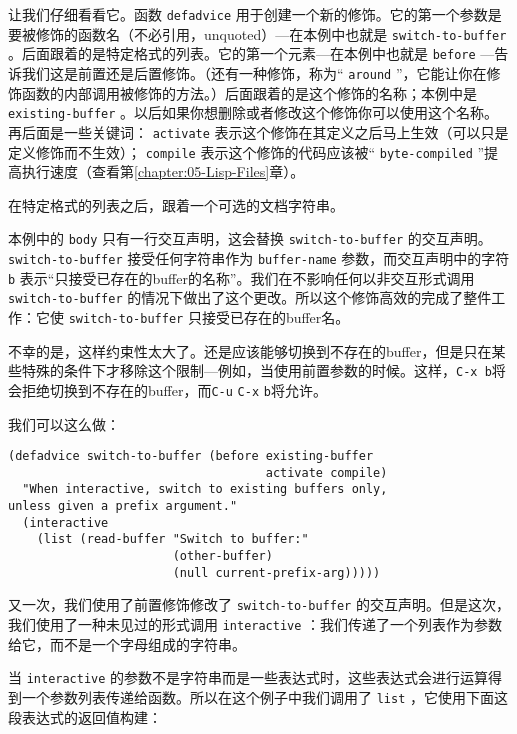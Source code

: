 让我们仔细看看它。函数 \texttt{defadvice} 用于创建一个新的修饰。它的第一个参数是要被修饰的函数名（不必引用，unquoted）---在本例中也就是 \texttt{switch-to-buffer} 。后面跟着的是特定格式的列表。它的第一个元素---在本例中也就是 \texttt{before} ---告诉我们这是前置还是后置修饰。（还有一种修饰，称为“ \texttt{around} ”，它能让你在修饰函数的内部调用被修饰的方法。）后面跟着的是这个修饰的名称；本例中是 \texttt{existing-buffer} 。以后如果你想删除或者修改这个修饰你可以使用这个名称。再后面是一些关键词： \texttt{activate} 表示这个修饰在其定义之后马上生效（可以只是定义修饰而不生效）； \texttt{compile} 表示这个修饰的代码应该被“ \texttt{byte-compiled} ”提高执行速度（查看第\ref{chapter:05-Lisp-Files}章）。

在特定格式的列表之后，跟着一个可选的文档字符串。

本例中的 \texttt{body} 只有一行交互声明，这会替换 \texttt{switch-to-buffer} 的交互声明。 \texttt{switch-to-buffer} 接受任何字符串作为 \texttt{buffer-name} 参数，而交互声明中的字符 \texttt{b} 表示“只接受已存在的buffer的名称”。我们在不影响任何以非交互形式调用 \texttt{switch-to-buffer} 的情况下做出了这个更改。所以这个修饰高效的完成了整件工作：它使 \texttt{switch-to-buffer} 只接受已存在的buffer名。

不幸的是，这样约束性太大了。还是应该能够切换到不存在的buffer，但是只在某些特殊的条件下才移除这个限制---例如，当使用前置参数的时候。这样，\verb|C-x b|将会拒绝切换到不存在的buffer，而\verb|C-u| \verb|C-x| \verb|b|将允许。

我们可以这么做：

\begin{verbatim}
(defadvice switch-to-buffer (before existing-buffer
                                    activate compile)
  "When interactive, switch to existing buffers only,
unless given a prefix argument."
  (interactive
    (list (read-buffer "Switch to buffer:"
                       (other-buffer)
                       (null current-prefix-arg)))))
\end{verbatim}

又一次，我们使用了前置修饰修改了 \texttt{switch-to-buffer} 的交互声明。但是这次，我们使用了一种未见过的形式调用 \texttt{interactive} ：我们传递了一个列表作为参数给它，而不是一个字母组成的字符串。

当 \texttt{interactive} 的参数不是字符串而是一些表达式时，这些表达式会进行运算得到一个参数列表传递给函数。所以在这个例子中我们调用了 \texttt{list} ，它使用下面这段表达式的返回值构建：

